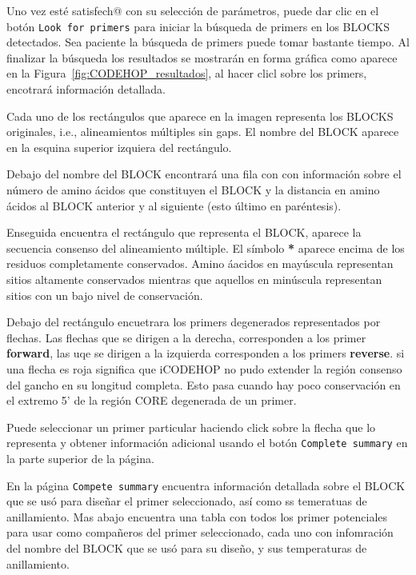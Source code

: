 \documentclass[letter,11pt]{book}
\begin{document}
Uno vez esté satisfech@ con su selección de parámetros, puede dar clic en el botón \Verb+Look for primers+ para iniciar la búsqueda de primers en los BLOCKS detectados. Sea paciente la búsqueda de primers puede tomar bastante tiempo. Al finalizar la búsqueda los resultados se mostrarán en forma gráfica como aparece en la Figura~\ref{fig:CODEHOP_resultados}, al hacer clicl sobre los primers, encotrará información detallada.

Cada uno de los rectángulos que aparece en la imagen representa los BLOCKS originales, i.e., alineamientos múltiples sin gaps. El nombre del BLOCK aparece en la esquina superior izquiera del rectángulo.

Debajo del nombre del BLOCK encontrará una fila con con información sobre el número de amino ácidos que constituyen el BLOCK y la distancia en amino ácidos al BLOCK anterior y al siguiente (esto \'{u}ltimo en par\'{e}ntesis).

Enseguida encuentra el rectángulo que representa el BLOCK, aparece la secuencia consenso del alineamiento m\'{u}ltiple. El s\'{i}mbolo \textbf{*} aparece encima de los residuos completamente conservados. Amino \'{a}acidos en may\'{u}scula representan sitios altamente conservados mientras que aquellos en min\'{u}scula representan sitios con un bajo nivel de conservaci\'{o}n.

Debajo del rectángulo encuetrara los primers degenerados representados por flechas. Las flechas que se dirigen a la derecha, corresponden a los primer \textbf{forward}, las uqe se dirigen a la izquierda corresponden a los primers \textbf{reverse}. si una flecha es roja significa que iCODEHOP no pudo extender la región consenso del gancho en su longitud completa. Esto pasa cuando hay poco conservación en el extremo 5' de la región CORE degenerada de un primer.

Puede seleccionar un primer particular haciendo click sobre la flecha que lo representa y obtener información adicional usando el botón \Verb+Complete summary+ en la parte superior de la página.

En la página \Verb+Compete summary+ encuentra información detallada sobre el BLOCK que se usó para diseñar el primer seleccionado, así como ss temeratuas de anillamiento. Mas abajo encuentra una tabla con todos los primer potenciales para usar como compañeros del primer seleccionado, cada uno con infomración del nombre del BLOCK que se usó para su diseño, y sus temperaturas de anillamiento.
\end{document}
